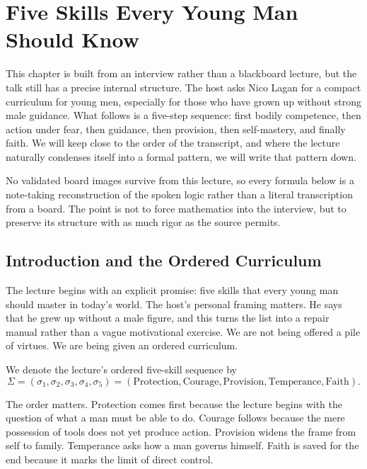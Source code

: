 \chapter{Five Skills Every Young Man Should Know}

This chapter is built from an interview rather than a blackboard lecture, but the talk still has a precise internal structure. The host asks Nico Lagan for a compact curriculum for young men, especially for those who have grown up without strong male guidance. What follows is a five-step sequence: first bodily competence, then action under fear, then guidance, then provision, then self-mastery, and finally faith. We will keep close to the order of the transcript, and where the lecture naturally condenses itself into a formal pattern, we will write that pattern down.

No validated board images survive from this lecture, so every formula below is a note-taking reconstruction of the spoken logic rather than a literal transcription from a board. The point is not to force mathematics into the interview, but to preserve its structure with as much rigor as the source permits.

\section{Introduction and the Ordered Curriculum}

The lecture begins with an explicit promise: five skills that every young man should master in today's world. The host's personal framing matters. He says that he grew up without a male figure, and this turns the list into a repair manual rather than a vague motivational exercise. We are not being offered a pile of virtues. We are being given an ordered curriculum.

\begin{definition}
We denote the lecture's ordered five-skill sequence by
\begin{equation}
\Sigma=(\sigma_1,\sigma_2,\sigma_3,\sigma_4,\sigma_5)
=(\mathrm{Protection},\mathrm{Courage},\mathrm{Provision},\mathrm{Temperance},\mathrm{Faith}).
\end{equation}
\end{definition}

The order matters. Protection comes first because the lecture begins with the question of what a man must be able to do. Courage follows because the mere possession of tools does not yet produce action. Provision widens the frame from self to family. Temperance asks how a man governs himself. Faith is saved for the end because it marks the limit of direct control.

